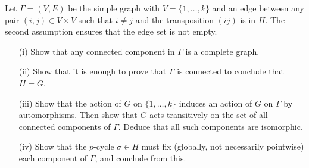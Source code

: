 \documentclass[12pt, a4paper]{article}
\begin{document}
Let $\Gamma = (V, E)$ be the simple graph with $V = \{1, \dots, k\}$ and an edge between any pair $(i,j) \in V \times V$ such that $i \neq j$ and the transposition $(ij)$ is in $H$. The second assumption ensures that the edge set is not empty.
\begin{itemize}
    \item[(i)] Show that any connected component in $\Gamma$ is a complete graph.
    \item[(ii)] Show that it is enough to prove that $\Gamma$ is connected to conclude that $H = G$.
    \item[(iii)] Show that the action of $G$ on $\{1, \dots, k\}$ induces an action of $G$ on $\Gamma$ by automorphisms. Then show that $G$ acts transitively on the set of all connected components of $\Gamma$. Deduce that all such components are isomorphic.
    \item[(iv)] Show that the $p$-cycle $\sigma \in H$ must fix (globally, not necessarily pointwise) each component of $\Gamma$, and conclude from this.
\end{itemize}
\end{document}
